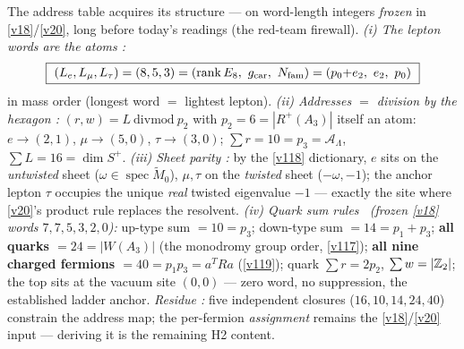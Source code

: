 
\begin{keybox}
The address table acquires its structure --- on word-length integers \emph{frozen} in \vref{v18}/\vref{v20}, long
before today's readings (the red-team firewall). \emph{(i) The lepton words are the atoms \mE:}
\[
  \boxed{\ (L_e,L_\mu,L_\tau)=(8,5,3)=(\operatorname{rank}E_8,\ \gcar,\ \Nfam)=(p_0{+}e_2,\ e_2,\ p_0)\ }
\]
in mass order (longest word $=$ lightest lepton). \emph{(ii) Addresses $=$ division by the hexagon
\mE:} $(r,w)=L\ \mathrm{divmod}\ p_2$ with $p_2=6=|R^+(A_3)|$ itself an atom: $e\to(2,1)$,
$\mu\to(5,0)$, $\tau\to(3,0)$; $\sum r=10=p_3=\mathcal A_\Lambda$, $\sum L=16=\dim S^+$. \emph{(iii) Sheet parity
\mE:} by the \vref{v118} dictionary, $e$ sits on the \emph{untwisted} sheet ($\omega\in\operatorname{spec}
\widetilde M_0$), $\mu,\tau$ on the \emph{twisted} sheet ($-\omega,-1$); the anchor lepton $\tau$
occupies the unique \emph{real} twisted eigenvalue $-1$ --- exactly the site where \vref{v20}'s product rule
replaces the resolvent. \emph{(iv) Quark sum rules \mE\ (frozen \vref{v18} words $7,7,5,3,2,0$):} up-type sum
$=10=p_3$; down-type sum $=14=p_1{+}p_3$; \textbf{all quarks $=24=|W(A_3)|$} (the monodromy group
order, \vref{v117}); \textbf{all nine charged fermions $=40=p_1p_3=a^TRa$} (\vref{v119}); quark $\sum r=2p_2$,
$\sum w=|\mathbb Z_2|$; the top sits at the vacuum site $(0,0)$ --- zero word, no suppression, the
established ladder anchor. \emph{Residue \mC:} five independent closures ($16,10,14,24,40$) constrain
the address map; the per-fermion \emph{assignment} remains the \vref{v18}/\vref{v20} input --- deriving it is the
remaining H2 content.
\end{keybox}

